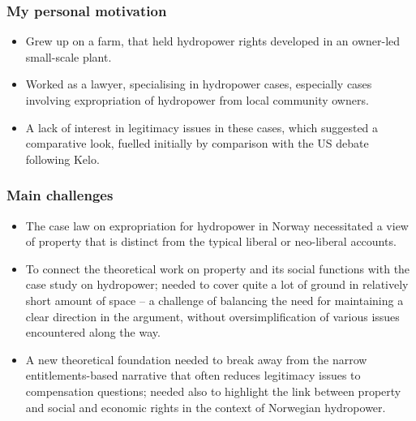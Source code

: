 \documentclass{beamer}
\begin{document}
\begin{frame}
\frametitle{My personal motivation} %

\begin{itemize}
\item Grew up on a farm, that held hydropower rights developed in an owner-led small-scale plant.
\item Worked as a lawyer, specialising in hydropower cases, especially cases involving expropriation of hydropower from local community owners.
\item A lack of interest in legitimacy issues in these cases, which suggested a comparative look, fuelled initially by comparison with the US debate following Kelo.
\end{itemize}
\end{frame}
\begin{frame}
\frametitle{Main challenges}
\begin{itemize}
\item The case law on expropriation for hydropower in Norway necessitated a view of property that is distinct from the typical liberal or neo-liberal accounts.
\item To connect the theoretical work on property and its social functions with the case study on hydropower; needed to cover quite a lot of ground in relatively short amount of space -- a challenge of balancing the need for maintaining a clear direction in the argument, without oversimplification of various issues encountered along the way. 
\item A new theoretical foundation needed to break away from the narrow entitlements-based narrative that often reduces legitimacy issues to compensation questions; needed also to highlight the link between property and social and economic rights in the context of Norwegian hydropower.
\end{itemize}
\end{frame}
\end{document}

